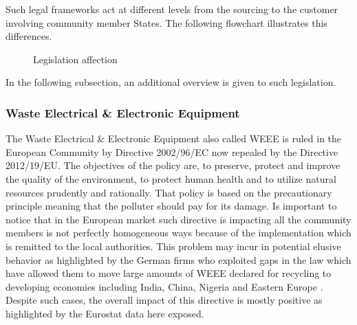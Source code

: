 \documentclass{article}
\begin{document}
  Such legal frameworks act at different levels from the sourcing to the customer involving community member States. The following flowchart illustrates this differences.

  \begin{figure}[ht]
    \centering

    \caption{Legislation affection}
  \end{figure}

  In the following subsection, an additional overview is given to such legislation.

\subsubsection{Waste Electrical \& Electronic Equipment}
  The Waste Electrical \& Electronic Equipment also called WEEE is ruled in the European Community by Directive 2002/96/EC now repealed by the Directive 2012/19/EU. The objectives of the policy are, to preserve, protect and improve the quality of the environment, to protect human health and to utilize natural resources prudently and rationally. That policy is based on the precautionary principle meaning that the polluter should pay for its damage. Is important to notice that in the European market such directive is impacting all the community members is not perfectly homogeneous ways because of the implementation which is remitted to the local authorities. This problem may incur in potential elusive behavior as highlighted by the German firms who exploited gaps in the law which have allowed them to move large amounts of WEEE declared for recycling to developing economies including India, China, Nigeria and Eastern Europe \cite{ongondo_how_2011}. Despite such cases, the overall impact of this directive is mostly positive as highlighted by the Eurostat data here exposed.
\end{document}
